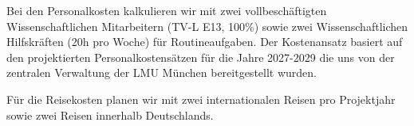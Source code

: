 \documentclass[11pt, a4paper]{article}
\newcommand{\instruction}[1]{{}}
\begin{document}
Bei den Personalkosten kalkulieren wir mit zwei vollbeschäftigten
Wissenschaftlichen Mitarbeitern (TV-L E13, 100\%) sowie zwei
Wissenschaftlichen Hilfskräften (20h pro Woche) für Routineaufgaben.
Der Kostenansatz basiert auf den projektierten Personalkostensätzen
für die Jahre 2027-2029 die uns von der zentralen Verwaltung der LMU
München bereitgestellt wurden.

Für die Reisekosten planen wir mit zwei internationalen Reisen pro
Projektjahr sowie zwei Reisen innerhalb Deutschlands.

\instruction{Bitte die Anlage ausfüllen und als separate Datei in
  elektronischer Form zusammen mit der Skizze einreichen. Bitte machen
  Sie dort unbedingt auf der vorgesehenen Seite entsprechende
  Anmerkungen zu den wichtigsten finanziellen Positionen. Ein grober
  Überblick reicht dabei, eine detaillierte Darstellung ist nicht
  notwendig.}



\end{document}
